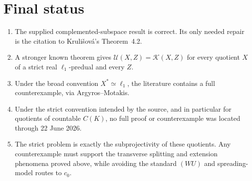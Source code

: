 \documentclass[11pt]{article}
\theoremstyle{definition}
\newcommand{\cU}{\mathcal U}
\newcommand{\cK}{\mathcal K}
\newcommand{\isom}{\simeq}
\begin{document}
\section{Final status}

\begin{enumerate}
\item The supplied complemented-subspace result is correct.  Its only needed
      repair is the citation to Kruli\v{s}ov\'a's Theorem~4.2.
\item A stronger known theorem gives $\cU(X,Z)=\cK(X,Z)$ for every quotient
      $X$ of a strict real $\ell_1$-predual and every $Z$.
\item Under the broad convention $X^*\isom\ell_1$, the literature contains a
      full counterexample, via Argyros--Motakis.
\item Under the strict convention intended by the source, and in particular
      for quotients of countable $C(K)$, no full proof or counterexample was
      located through 22 June 2026.
\item The strict problem is exactly the subprojectivity of these quotients.
      Any counterexample must support the transverse splitting and extension
      phenomena proved above, while avoiding the standard $(WU)$ and
      spreading-model routes to $c_0$.
\end{enumerate}
\end{document}
